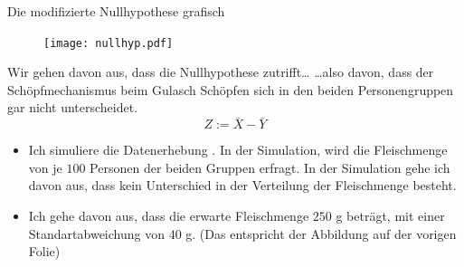 \documentclass[usenames,dvipsnames,handout]{beamer}
\begin{document}
\begin{frame}{Die modifizierte Nullhypothese grafisch}
\begin{figure}[ht]
 	\centering
 	      \texttt{[image: nullhyp.pdf]}
 	\end{figure}
\end{frame}

\begin{frame}{Wir gehen davon aus, dass die Nullhypothese zutrifft\dots}
\dots also davon, dass der Schöpfmechanismus beim Gulasch Schöpfen sich in den beiden Personengruppen gar nicht unterscheidet.
$$Z:=\bar{X}-\bar{Y}$$
\begin{itemize}
\item{Ich  simuliere die Datenerhebung . In der Simulation, wird die Fleischmenge von je $100$ Personen der 
beiden  Gruppen erfragt. In der Simulation gehe ich davon aus, dass kein Unterschied in der Verteilung der Fleischmenge besteht.}\pause
\item{Ich gehe davon aus, dass die erwarte Fleischmenge $250$ g beträgt, mit einer Standartabweichung von $40$ g. (Das entspricht der Abbildung auf der vorigen
Folie)} 
\end{itemize}
\end{frame}
\end{document}
